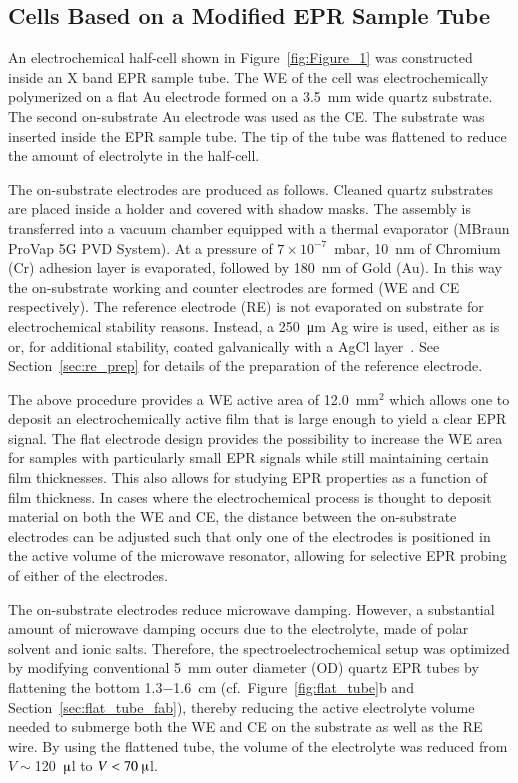 \newpage
\subsection{Cells Based on a Modified EPR Sample Tube}
\label{sec:tube_cell}
\label{electrode_setup}

An electrochemical half-cell shown in Figure~\ref{fig:Figure_1} was constructed inside an X band EPR sample tube. The WE of the cell was electrochemically polymerized on a flat Au electrode formed on a 3.5~mm wide quartz substrate. The second on-substrate Au electrode was used as the CE. The substrate was inserted inside the EPR sample tube. The tip of the tube was flattened to reduce the amount of electrolyte in the half-cell.\\
\par
The on-substrate electrodes are produced as follows. Cleaned quartz substrates are placed inside a holder and covered with shadow masks. The assembly is transferred into a vacuum chamber equipped with a thermal evaporator (MBraun ProVap 5G PVD System). At a pressure of $7\times10^{-7}$~mbar, 10~nm of Chromium (Cr) adhesion layer is evaporated, followed by 180~nm of Gold (Au). In this way the on-substrate working and counter electrodes are formed (WE and CE respectively). The reference electrode (RE) is not evaporated on substrate for electrochemical stability reasons. Instead, a \SI{250}{\micro\meter} Ag wire is used, either as is or, for additional stability, coated galvanically with a AgCl layer~\cite{Safari2011}. See Section~\ref{sec:re_prep} for details of the preparation of the reference electrode.\\
\par
The above procedure provides a WE active area of 12.0~mm$^2$ which allows one to deposit an electrochemically active film that is large enough to yield a clear EPR signal. The flat electrode design provides the possibility to increase the WE area for samples with particularly small EPR signals while still maintaining certain film thicknesses. This also allows for studying EPR properties as a function of film thickness. In cases where the electrochemical process is thought to deposit material on both the WE and CE, the distance between the on-substrate electrodes can be adjusted such that only one of the electrodes is positioned in the active volume of the microwave resonator, allowing for selective EPR probing of either of the electrodes.\\
\par
The on-substrate electrodes reduce microwave damping. However, a substantial amount of microwave damping occurs due to the electrolyte, made of polar solvent and ionic salts. Therefore, the spectroelectrochemical setup was optimized by modifying conventional 5~mm outer diameter (OD) quartz EPR tubes by flattening the bottom 1.3$-$1.6~cm (cf.\ Figure~\ref{fig:flat_tube}b and Section~\ref{sec:flat_tube_fab}), thereby reducing the active electrolyte volume needed to submerge both the WE and CE on the substrate as well as the RE wire. By using the flattened tube, the volume of the electrolyte was reduced from $V\sim$120~$\muup$l to $V<70~\muup$l.


